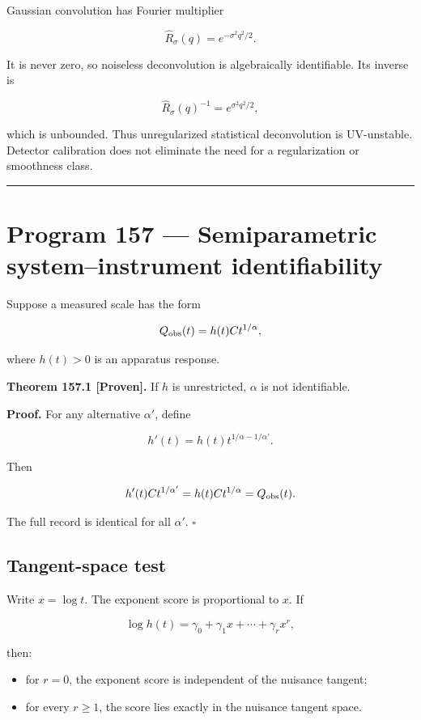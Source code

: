 \documentclass[11pt,a4paper,openany]{report}
\newcommand{\statusProven}{\textcolor{fingreen}{[Proven]}}
\begin{document}
Gaussian convolution has Fourier multiplier

\[
\widehat R_\sigma(q)=e^{-\sigma^2q^2/2}.
\]

It is never zero, so noiseless deconvolution is algebraically identifiable. Its inverse is

\[
\widehat R_\sigma(q)^{-1}=e^{\sigma^2q^2/2},
\]

which is unbounded. Thus unregularized statistical deconvolution is UV-unstable. Detector calibration does not eliminate the need for a regularization or smoothness class.

\par\medskip\hrule\medskip

\chapter{Program 157 --- Semiparametric system--instrument identifiability}

Suppose a measured scale has the form

\[
Q_{\rm obs}(t)=h(t)C t^{1/\alpha},
\]

where \(h(t)>0\) is an apparatus response.

\textbf{Theorem 157.1 \statusProven{}.} If \(h\) is unrestricted, \(\alpha\) is not identifiable.

\textbf{Proof.} For any alternative \(\alpha'\), define

\[
h'(t)
=
h(t)t^{1/\alpha-1/\alpha'}.
\]

Then

\[
h'(t)Ct^{1/\alpha'}
=
h(t)Ct^{1/\alpha}
=Q_{\rm obs}(t).
\]

The full record is identical for all \(\alpha'\). \(\square\)

\section{Tangent-space test}

Write \(x=\log t\). The exponent score is proportional to \(x\). If

\[
\log h(t)=\gamma_0+\gamma_1x+\cdots+\gamma_rx^r,
\]

then:

\begin{itemize}
\item 
for \(r=0\), the exponent score is independent of the nuisance tangent;

\item 
for every \(r\ge1\), the score lies exactly in the nuisance tangent space.

\end{itemize}
\end{document}
